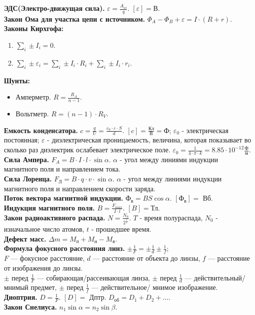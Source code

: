 \documentclass[12pt]{article}
\begin{document}
	\textbf{ЭДС(Электро-движущая сила).} $\varepsilon = \frac{A_{\text{ст}}}{q}$. $[\varepsilon] = \text{В}$. \\
	\textbf{Закон Ома для участка цепи с источником.} $\Phi_{A} - \Phi_{B} + \varepsilon = I \cdot (R + r)$. \\
	\textbf{Законы Кирхгофа:}
	\begin{enumerate}
		\item $\sum \limits_{i} \pm I_{i} = 0$.
		\item $\sum \limits_{i} \pm \varepsilon_{i} = \sum \limits_{i} \pm I_{i} \cdot R_{i} + \sum \limits_{i} \pm I_{i} \cdot r_{i}$.
	\end{enumerate}
	\textbf{Шунты:}
	\begin{itemize}
		\item Амперметр. $R = \frac{R_{A}}{n - 1}$.
		\item Вольтметр. $R = (n - 1) \cdot R_{V}$.
	\end{itemize}
	\textbf{Емкость конденсатора.} $c = \frac{q}{U} = \frac{\varepsilon_{0} \cdot \varepsilon \cdot S}{d}$. $[c] = \frac{\text{Кл}}{\text{В}} = \text{Ф}$; $\varepsilon_{0}$ - электрическая постоянная; $\varepsilon$ - диэлектрическая проницаемость, величина, которая показывает во сколько раз диэлектрик ослабевает электрическое поле. $\varepsilon_{0} = \frac{1}{4 \cdot \pi \cdot k} = 8.85 \cdot 10^{-12} \frac{\text{Ф}}{\text{м}}$. \\
	\textbf{Сила Ампера.} $F_{A} = B \cdot I \cdot l \cdot \sin\alpha$. $\alpha$ - угол между линиями индукции магнитного поля и направлением тока. \\
	\textbf{Сила Лоренца.} $F_{\text{Л}} = B \cdot q \cdot v \cdot \sin\alpha$. $\alpha$ - угол между линиями индукции магнитного поля и направлением скорости заряда. \\
	\textbf{Поток вектора магнитной индукции.} $\text{Ф}_{\text{в}} = BS \cos\alpha$. $[\text{Ф}_{\text{в}}] =$ Вб. \\
	\textbf{Индукция магнитного поля.} $B = \frac{F_{max}}{I \cdot l}$. $[B] = \text{Тл}$. \\
	\textbf{Закон радиоактивного распада.} $N = \frac{N_{0}}{2^{\frac{t}{T}}}$. $T$ - время полураспада, $N_{0}$ - изначальное число атомов, $t$ - прошедшее время. \\
	\textbf{Дефект масс.} $\varDelta m = M_{\text{п}} + M_{\text{н}} - M_{\text{я}}$. \\
	\textbf{Формула фокусного расстояния линз.} $\pm \frac{1}{F} = \pm \frac{1}{d} \pm \frac{1}{f}$; \\
	$F$ --- фокусное расстояние, $d$ --- расстояние от объекта до линзы, $f$ --- расстояние от изображения до линзы. \\
	$\pm$ перед $\frac{1}{F}$ --- собирающая/рассеивающая линза, $\pm$ перед $\frac{1}{d}$ --- действительный/мнимый предмет, $\pm$ перед $\frac{1}{f}$ --- действительное/ мнимое изображение. \\
	\textbf{Диоптрия.} $D = \frac{1}{F}$. $[D] =$ Дптр. $D_{\text{об}} = D_1 + D_2 + \dots$. \\
	\textbf{Закон Снелиуса.} $n_1 \sin\alpha = n_2 \sin\beta$.
	
\end{document}
